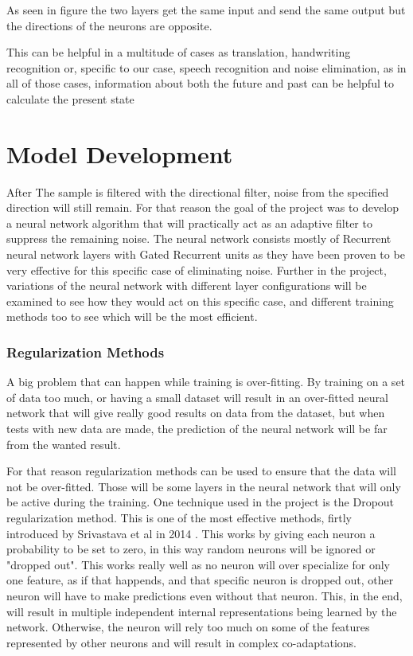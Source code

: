 As seen in figure  the two layers get the same input and send the same output but the directions of the neurons are opposite.

This can be helpful in a multitude of cases as translation, handwriting recognition or, specific to our case, speech recognition and noise elimination, as in all of those cases, information about both the future and past can be helpful to calculate the present state 
\section{Model Development}

After The sample is filtered with the directional filter, noise from the specified direction will still remain. For that reason the goal of the project was to develop a neural network algorithm that will practically act as an adaptive filter to suppress the remaining noise. The neural network consists mostly of Recurrent neural network layers with Gated Recurrent units as they have been proven to be very effective for this specific case of eliminating noise. Further in the project, variations of the neural network with different layer configurations will be examined to see how they would act on this specific case, and different training methods too to see which will be the most efficient.

\subsubsection{Regularization Methods}
A big problem that can happen while training is over-fitting. By training on a set of data too much, or having a small dataset will result in an over-fitted neural network that will give really good results on data from the dataset, but when tests with new data are made, the prediction of the neural network will be far from the wanted result.


For that reason regularization methods can be used to ensure that the data will not be over-fitted. Those will be some layers in the neural network that will only be active during the training.
One technique used in the project is the Dropout regularization method. This is one of the most effective methods, firtly introduced by Srivastava et al in 2014 . This works by giving each neuron a probability to be set to zero, in this way random neurons will be ignored or "dropped out". This works really well as no neuron will over specialize for only one feature, as if that happends, and that specific neuron is dropped out, other neuron will have to make predictions even without that neuron. This, in the end, will result in multiple independent internal representations being learned by the network. Otherwise, the neuron will rely too much on some of the features represented by other neurons and will result in complex co-adaptations.


